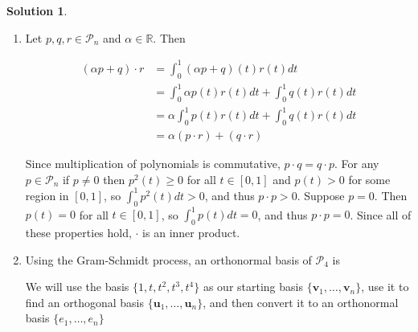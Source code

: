 \documentclass[11pt]{article}
\theoremstyle{definition}
\newtheorem*{solution}{Solution}
\newcommand{\R}{\mathbb{R}}
\newcommand{\vv}{\mathbf{v}}
\newcommand{\vu}{\mathbf{u}}
\newcommand{\poly}{\mathcal{P}}
\begin{document}
    \begin{solution}
        \begin{enumerate}[label = \alph*)]
            \item Let $p,q,r \in \poly_n$ and $\alpha \in \R$. Then 
            
            \begin{align*}
                (\alpha p + q) \cdot r &= \int_0^1 (\alpha p + q)(t)r(t)dt \\
                &= \int_0^1 \alpha p(t)r(t) dt + \int_0^1 q(t)r(t) dt \\
                &= \alpha \int_0^1 p(t)r(t) dt + \int_0^1 q(t)r(t) dt\\
                &= \alpha (p \cdot r) + (q \cdot r)
            \end{align*}

            Since multiplication of polynomials is commutative, $p \cdot q = q \cdot p$. For any $p \in \poly_n$ if $p \neq 0$ then $p^2(t) \ge 0$ for all $t \in [0,1]$ and $p(t) > 0$ for some region in $[0,1]$, so $\int_0^1 p^2(t) dt > 0$, and thus $p\cdot p > 0$. Suppose $p = 0$. Then $p(t) = 0$ for all $t \in [0,1]$, so $\int_0^1 p(t)dt = 0$, and thus $p \cdot p = 0$. Since all of these properties hold, $\cdot$ is an inner product.

            \item Using the Gram-Schmidt process, an orthonormal basis of $\poly_4$ is 
            
            We will use the basis $\{1, t, t^2, t^3, t^4\}$ as our starting basis $\{\vv_1, \dots, \vv_n\}$, use it to find an orthogonal basis $\{\vu_1, \dots, \vu_n\}$, and then convert it to an orthonormal basis $\{e_1, \dots, e_n\}$


\end{enumerate}
\end{solution}
\end{document}
